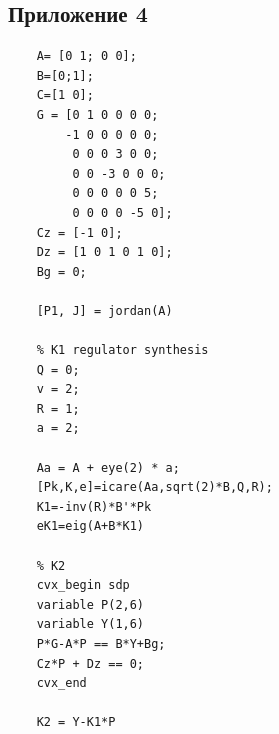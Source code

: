 \documentclass[a4paper, 12pt]{article}
\begin{document}
    \subsection{Приложение 4}
    \begin{lstlisting}[label=task4, caption={Программа для задания 4}]
    % plant parameters
    A= [0 1; 0 0];
    B=[0;1];
    C=[1 0];
    G = [0 1 0 0 0 0;
        -1 0 0 0 0 0;
         0 0 0 3 0 0;
         0 0 -3 0 0 0;
         0 0 0 0 0 5;
         0 0 0 0 -5 0];
    Cz = [-1 0];
    Dz = [1 0 1 0 1 0];
    Bg = 0;

    [P1, J] = jordan(A)

    % K1 regulator synthesis
    Q = 0;
    v = 2;
    R = 1;
    a = 2;

    Aa = A + eye(2) * a;
    [Pk,K,e]=icare(Aa,sqrt(2)*B,Q,R);
    K1=-inv(R)*B'*Pk
    eK1=eig(A+B*K1)

    % K2
    cvx_begin sdp
    variable P(2,6)
    variable Y(1,6)
    P*G-A*P == B*Y+Bg;
    Cz*P + Dz == 0;
    cvx_end

    K2 = Y-K1*P
    \end{lstlisting}
\end{document}
